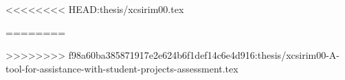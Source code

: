 \documentclass[english,odsaz]{fitthesis} %
\begin{document}

\ifslovak
  \makeatletter
  \def\@openbib@code{\addcontentsline{toc}{chapter}{Literatúra}}
  \makeatother
  
\else
  \ifczech
    \makeatletter
    \def\@openbib@code{\addcontentsline{toc}{chapter}{Literatura}}
    \makeatother
    
  \else 
    \makeatletter
    \def\@openbib@code{\addcontentsline{toc}{chapter}{Bibliography}}
    \makeatother
    
  \fi
\fi
  \begin{flushleft}
<<<<<<<< HEAD:thesis/xcsirim00.tex
  
========
  
>>>>>>>> f98a60ba385871917e2e624b6f1def14c6e4d916:thesis/xcsirim00-A-tool-for-assistance-with-student-projects-assessment.tex
  \end{flushleft}

  \iftwoside
    \cleardoublepage
  \fi

  \appendix
\ifczech
  \renewcommand{\appendixpagename}{Přílohy}
  \renewcommand{\appendixtocname}{Přílohy}
  \renewcommand{\appendixname}{Příloha}
\fi
\ifslovak
  \renewcommand{\appendixpagename}{Prílohy}
  \renewcommand{\appendixtocname}{Prílohy}
  \renewcommand{\appendixname}{Príloha}
\fi

  
\ifslovak
\else
  \ifczech
  \else
  \fi
\fi
  \startcontents[chapters]
  \setlength{\parskip}{0pt} 
  
\end{document}

